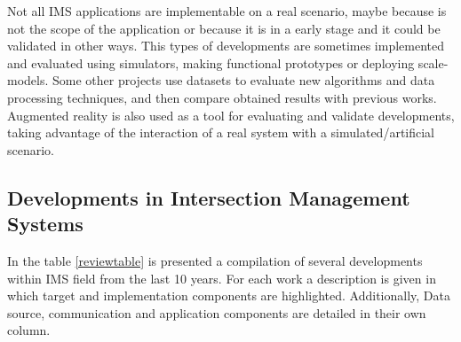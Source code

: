 \documentclass[conference]{IEEEtran}
\begin{document}
Not all IMS applications are implementable on a real scenario, maybe because is not the scope of the application or because it is in a early stage and it could be validated in other ways. This types of developments are sometimes implemented and evaluated using simulators, making functional prototypes or deploying scale-models. Some other projects use datasets to evaluate new algorithms and data processing techniques, and then compare obtained results with previous works. Augmented reality is also used as a tool for evaluating and validate developments, taking advantage of the interaction of a real system with a simulated/artificial scenario.

\subsection{Developments in Intersection Management Systems}

In the table \ref{reviewtable} is presented a compilation of several developments within IMS field from the last 10 years. For each work a description is given in which target and implementation components are highlighted. Additionally, Data source, communication and application components are detailed in their own column. 



%
\end{document}

